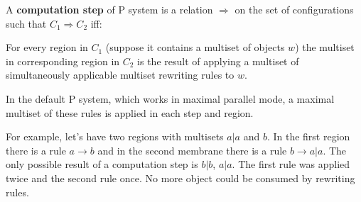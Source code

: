 A {\bf computation step} of P system is a relation $\Rightarrow$ on the set of configurations such that $C_1 \Rightarrow C_2$ iff:

For every region in $C_1$ (suppose it contains a multiset of objects $w$) the multiset in corresponding region in $C_2$ is the result of applying a multiset of simultaneously applicable multiset rewriting rules to $w$.

In the default P system, which works in maximal parallel mode, a maximal multiset of these rules is applied in each step and region.

For example, let's have two regions with multisets $a|a$ and $b$. In the first region there is a rule $a\rightarrow b$ and in the second membrane there is a rule $b\rightarrow a|a$. The only possible result of a computation step is $b|b$, $a|a$. The first rule was applied twice and the second rule once. No more object could be consumed by rewriting rules.
